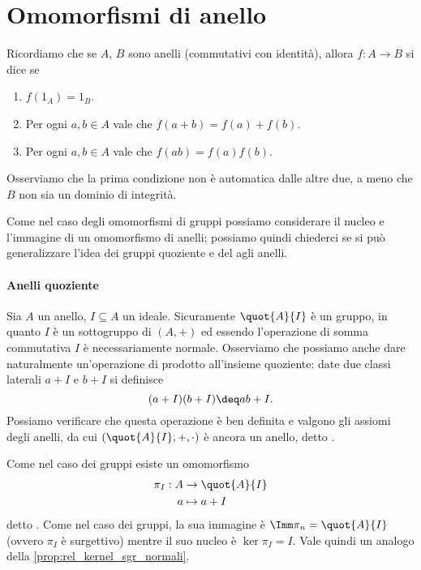 \section{Omomorfismi di anello}

Ricordiamo che se $A$, $B$ sono anelli (commutativi con identità), allora $f : A \to B$ si dice  se 
\begin{enumerate}[label={(\arabic*)}]
    \item $f(1_A) = 1_B$.
    \item Per ogni $a, b \in A$ vale che $f(a + b) = f(a) + f(b)$.
    \item Per ogni $a, b \in A$ vale che $f(ab) = f(a)f(b)$.
\end{enumerate}

Osserviamo che la prima condizione non è automatica dalle altre due, a meno che $B$ non sia un dominio di integrità.

Come nel caso degli omomorfismi di gruppi possiamo considerare il nucleo e l'immagine di un omomorfismo di anelli; possiamo quindi chiederci se si può generalizzare l'idea dei gruppi quoziente e del  agli anelli.

\paragraph{Anelli quoziente}

Sia $A$ un anello, $I \subseteq A$ un ideale. Sicuramente $\quot{A}{I}$ è un gruppo, in quanto $I$ è un sottogruppo di $(A, +)$ ed essendo l'operazione di somma commutativa $I$ è necessariamente normale. Osserviamo che possiamo anche dare naturalmente un'operazione di prodotto all'insieme quoziente: date due classi laterali $a + I$ e $b + I$ si definisce \[
    (a+I)(b+I) \deq ab + I.    
\] Possiamo verificare che questa operazione è ben definita e valgono gli assiomi degli anelli, da cui $(\quot{A}{I}, +, \cdot)$ è ancora un anello, detto .

Come nel caso dei gruppi esiste un omomorfismo \begin{align*}
    \pi_I : A &\to \quot{A}{I}    \\
    a &\mapsto a + I
\end{align*} detto . Come nel caso dei gruppi, la sua immagine è $\Imm \pi_n = \quot{A}{I}$ (ovvero $\pi_I$ è surgettivo) mentre il suo nucleo è $\ker \pi_I = I$. Vale quindi un analogo della \autoref{prop:rel_kernel_sgr_normali}.

